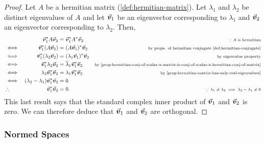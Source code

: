 \documentclass[../MathsNotesBase.tex]{subfiles}
\begin{document}
{		\bigskip
		\begin{proof}
			Let $A$ be a hermitian matrix (\ref{def:hermitian-matrix}). Let $\lambda_1$ and $\lambda_2$ be distinct eigenvalues of $A$ and let $\vec{\bm{v}}_1$ be an eigenvector corresponding to $\lambda_1$ and $\vec{\bm{v}}_2$ an eigenvector corresponding to $\lambda_2$. Then,
			\[\begin{aligned}
				&& \vec{\bm{v}}_1^* A \vec{\bm{v}}_2 &= \vec{\bm{v}}_1^* A^* \vec{\bm{v}}_2     &\text{\scriptsize{$\because A$ is hermitian}}\\
				&\iff & \vec{\bm{v}}_1^* (A \vec{\bm{v}}_2) &= (A \vec{\bm{v}}_1)^* \vec{\bm{v}}_2     &\text{\scriptsize{by props. of hermitian conjugate \ref{def:hermitian-conjugate}}} \\
				&\iff & \vec{\bm{v}}_1^* (\lambda_2 \vec{\bm{v}}_2) &= (\lambda_1 \vec{\bm{v}}_1)^* \vec{\bm{v}}_2    &\text{\scriptsize{by eigenvalue property}} \\
				&\iff & \vec{\bm{v}}_1^* \lambda_2 \vec{\bm{v}}_2 &= \overline{\lambda}_1 \vec{\bm{v}}_1^* \vec{\bm{v}}_2    &\text{\scriptsize{by \ref{prop:hermitian-conj-of-scalar-x-matrix-is-conj-of-scalar-x-hermitian-conj-of-matrix}}} \\
				&\iff & \lambda_2 \vec{\bm{v}}_1^* \vec{\bm{v}}_2 &= \lambda_1 \vec{\bm{v}}_1^* \vec{\bm{v}}_2    &\text{\scriptsize{by \ref{prop:hermitian-matrix-has-only-real-eigenvalues}}} \\
				&\iff & (\lambda_2 - \lambda_1) \vec{\bm{v}}_1^* \vec{\bm{v}}_2 &= 0 \\
				&\therefore & \vec{\bm{v}}_1^* \vec{\bm{v}}_2 &= 0.   &\text{\scriptsize{${ \because \lambda_1 \neq \lambda_2 \implies \lambda_2 - \lambda_1 \neq 0 }$}}
			\end{aligned}\]
			This last result says that the standard complex inner product of $\vec{\bm{v}}_1$ and $\vec{\bm{v}}_2$ is zero. We can therefore deduce that $\vec{\bm{v}}_1$ and $\vec{\bm{v}}_2$ are orthogonal.
		\end{proof}
	
	
		
		\bigskip
		\subsubsection{Normed Spaces}
		\bigskip
		}
\end{document}
